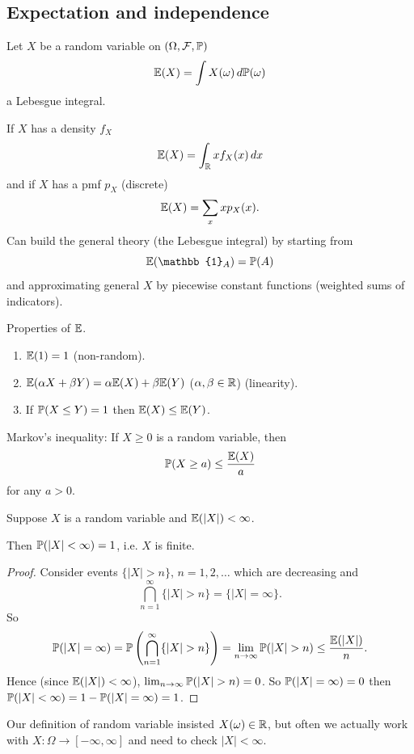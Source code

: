 \documentclass[10pt, a4paper]{article}
\begin{document}
\subsection{Expectation and independence}
Let $X$ be a random variable on $(\Omega, \mathcal{F}, \P)$
\[
\E(X) = \int X(\omega)\,d\P(\omega)
\]
a Lebesgue integral.

If $X$ has a density $f_{X}$
\[
\E(X) = \int_{\R}xf_{X}(x)\,dx
\]
and if $X$ has a pmf $p_{X}$
(discrete)
\[
\E(X) = \sum_{x}xp_{X}(x).
\]
Can build the general theory
(the Lebesgue integral)
by starting from
\[
\E(\mathbb{1}_A) = \P(A)
\]
and approximating general $X$ by piecewise constant functions
(weighted sums of indicators).

Properties of $\E$.
\begin{enumerate}[label = (\roman*)]
    \item $\E(1) = 1$
    (non-random).

    \item $\E(\alpha X + \beta Y) = \alpha\E(X) + \beta\E(Y)$
    ($\alpha, \beta \in \R$)
    (linearity).

    \item If $\P(X \leq Y) = 1$ then $\E(X) \leq \E(Y)$.
\end{enumerate}

Markov's inequality:
If $X \geq 0$ is a random variable,
then
\[
\P(X \geq a) \leq \frac{\E(X)}{a}
\]
for any $a > 0$.

\begin{proposition}
    Suppose $X$ is a random variable and $\E(|X|) < \infty$.

    Then $\P(|X| < \infty) = 1$,
    i.e. $X$ is finite.

    \begin{proof}
        Consider events $\{|X| > n\}$,
        $n = 1, 2, \dotsc$ which are decreasing and
        \[
        \bigcap_{n = 1}^{\infty}\{|X| > n\} = \{|X| = \infty\}.
        \]
        So
        \[
        \P(|X| = \infty) = \P\left(\bigcap_{n = 1}^{\infty}\{|X| > n\}\right) = \lim_{n \to \infty}\P(|X| > n) \leq \frac{\E(|X|)}{n}.
        \]
        Hence
        (since $\E(|X|) < \infty$),
        $\lim_{n \to \infty}\P(|X| > n) = 0$.
        So $\P(|X| = \infty) = 0$ then $\P(|X| < \infty) = 1 - \P(|X|  = \infty) = 1$.
        
    \end{proof}
\end{proposition}

Our definition of random variable insisted $X(\omega) \in \R$,
but often we actually work with $X : \Omega \to [-\infty, \infty]$ and need to check $|X| < \infty$.
\end{document}
